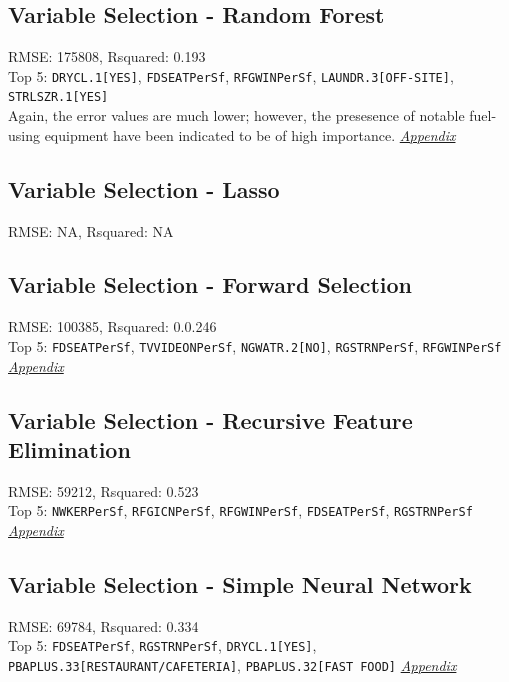 \subsection{Variable Selection - Random Forest}
RMSE: 175808, Rsquared: 0.193\\
Top 5: \lstinline{DRYCL.1[YES]}, \lstinline{FDSEATPerSf}, \lstinline{RFGWINPerSf}, \lstinline{LAUNDR.3[OFF-SITE]}, \lstinline{STRLSZR.1[YES]} 
\\[0.1in]
Again, the error values are much lower; however, the presesence of notable fuel-using equipment have been indicated to be of high importance. \textit{\hyperref[appendix:natural_gas:rf]{Appendix}}

\subsection{Variable Selection - Lasso}
RMSE: NA, Rsquared: NA\\

\subsection{Variable Selection - Forward Selection}
RMSE: 100385, Rsquared: 0.0.246\\
Top 5: \lstinline{FDSEATPerSf}, \lstinline{TVVIDEONPerSf}, \lstinline{NGWATR.2[NO]}, \lstinline{RGSTRNPerSf}, \lstinline{RFGWINPerSf}  \textit{\hyperref[appendix:natural_gas:lp]{Appendix}}

\subsection{Variable Selection - Recursive Feature Elimination}
RMSE: 59212, Rsquared: 0.523\\
Top 5: \lstinline{NWKERPerSf}, \lstinline{RFGICNPerSf}, \lstinline{RFGWINPerSf}, \lstinline{FDSEATPerSf}, \lstinline{RGSTRNPerSf}  \textit{\hyperref[appendix:natural_gas:rfe]{Appendix}}

\subsection{Variable Selection - Simple Neural Network}
RMSE: 69784, Rsquared: 0.334\\
Top 5: \lstinline{FDSEATPerSf}, \lstinline{RGSTRNPerSf}, \lstinline{DRYCL.1[YES]}, \lstinline{PBAPLUS.33[RESTAURANT/CAFETERIA]}, \lstinline{PBAPLUS.32[FAST FOOD]}  
\textit{\hyperref[appendix:natural_gas:snn]{Appendix}}

